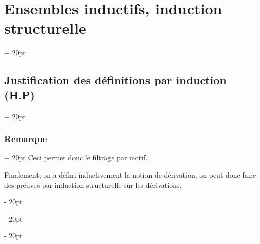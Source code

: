 \documentclass[a4paper, 12pt, twoside]{article}
\newcommand{\ind}[1][20pt]{\advance\leftskip + #1}
\newcommand{\deind}[1][20pt]{\advance\leftskip - #1}
\newenvironment{indt}[2][20pt]{#2 \par \ind[#1]}{\par \deind} %
\begin{document}
\begin{indt}{\section{Ensembles inductifs, induction structurelle}}
\begin{indt}{\subsection{Justification des définitions par induction (H.P)}}
\begin{indt}{\subsubsection{Remarque}}
                Ceci permet donc le filtrage par motif.
                
                Finalement, on a défini inductivement la notion de dérivation, on peut donc faire des preuves par induction structurelle sur les dérivations.
            \end{indt}
        \end{indt}
        
    \end{indt}

    

    
    
\end{document}
